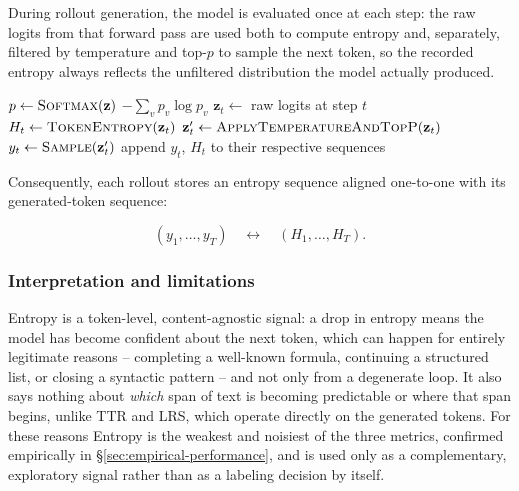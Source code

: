 \documentclass{article}
\begin{document}
During rollout generation, the model is evaluated once at each step: the raw
logits from that forward pass are used both to compute entropy and,
separately, filtered by temperature and top-$p$ to sample the next token, so
the recorded entropy always reflects the unfiltered distribution the model
actually produced.

\begin{algorithm}[h]
\caption{Autoregressive decoding with entropy recording}
\label{alg:entropy-generation}
\begin{algorithmic}[1]
    \State $p \gets \Call{Softmax}{\mathbf{z}}$
    \State \Return $-\sum_{v} p_v \log p_v$
\EndFunction
\Statex
{}
    \State $\mathbf{z}_t \gets$ raw logits at step $t$
    \State $H_t \gets \Call{TokenEntropy}{\mathbf{z}_t}$ 
    \State $\mathbf{z}_t' \gets \Call{ApplyTemperatureAndTopP}{\mathbf{z}_t}$
    \State $y_t \gets \Call{Sample}{\mathbf{z}_t'}$
    \State append $y_t$, $H_t$ to their respective sequences
\EndFor
\end{algorithmic}
\end{algorithm}

Consequently, each rollout stores an entropy sequence aligned one-to-one
with its generated-token sequence:

\begin{equation}
(y_1,\ldots,y_T)
\quad\longleftrightarrow\quad
(H_1,\ldots,H_T).
\end{equation}

\subsubsection{Interpretation and limitations}

Entropy is a token-level, content-agnostic signal: a drop in entropy means
the model has become confident about the next token, which can happen for
entirely legitimate reasons -- completing a well-known formula, continuing
a structured list, or closing a syntactic pattern -- and not only from a
degenerate loop. It also says nothing about \emph{which} span of text is
becoming predictable or where that span begins, unlike TTR and LRS, which
operate directly on the generated tokens. For these reasons Entropy is the
weakest and noisiest of the three metrics, confirmed empirically in
\S\ref{sec:empirical-performance}, and is used only as a complementary,
exploratory signal rather than as a labeling decision by itself.
\end{document}
